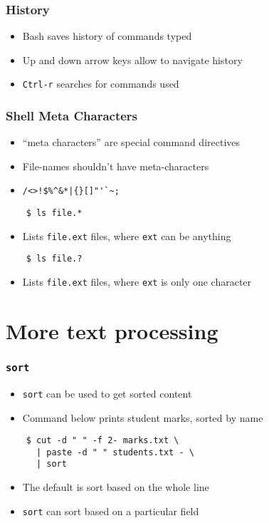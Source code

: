 \documentclass[12pt,compress]{beamer}
\begin{document}
\begin{frame}[fragile]
  \frametitle{History}
  \begin{itemize}
  \item Bash saves history of commands typed
  \item Up and down arrow keys allow to navigate history
  \item \texttt{Ctrl-r} searches for commands used
  \end{itemize}
\end{frame}

\begin{frame}[fragile]
  \frametitle{Shell Meta Characters}
  \begin{itemize}
  \item ``meta characters''  are special command directives
  \item File-names shouldn't have meta-characters
  \item   \verb+/<>!$%^&*|{}[]"'`~;+
  \end{itemize}
  \begin{lstlisting}
    $ ls file.*
  \end{lstlisting} %
  \begin{itemize}
  \item Lists \texttt{file.ext} files, where \texttt{ext} can be
    anything
  \end{itemize}
  \begin{lstlisting}
    $ ls file.?
  \end{lstlisting} %
  \begin{itemize}
  \item Lists \texttt{file.ext} files, where \texttt{ext} is only one
    character 
  \end{itemize}
\end{frame}

\section{More text processing}

\begin{frame}[fragile]
  \frametitle{\texttt{sort}}
  \begin{itemize}
  \item \texttt{sort} can be used to get sorted content
  \item Command below prints student marks, sorted by name
  \end{itemize}
  \begin{lstlisting}
    $ cut -d " " -f 2- marks.txt \
      | paste -d " " students.txt - \
      | sort
  \end{lstlisting} %
  \begin{itemize}
  \item The default is sort based on the whole line
  \item \texttt{sort} can sort based on a particular field
  \end{itemize}
\end{frame}
\end{document}
